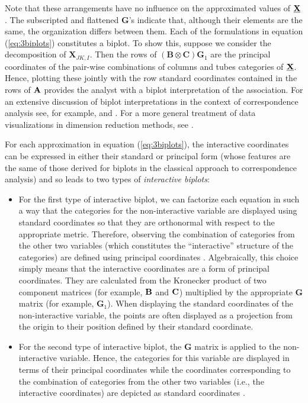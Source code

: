 Note that these arrangements have no influence on the approximated values of $\underline{\bf X}$. The subscripted and flattened $\mathbf{G}$'s indicate that, although their elements are the same, the organization differs between them. Each of the formulations in equation (\ref{eq:3biplots})  constitutes a biplot. To show this, suppose we consider the decomposition of $\mathbf{X}_{JK,I}$. Then the rows of $\left(\mathbf{B} \otimes \mathbf{C} \right) \mathbf{G}_1$ are the principal coordinates of the pair-wise combinations of columns and tubes categories of $\underline{\bf X}$. Hence, plotting these jointly with the row standard coordinates contained in the rows of ${\bf A}$ provides the analyst with a  biplot interpretation of the association. For an extensive discussion of biplot interpretations in the context of correspondence analysis see, for example, \citet{gre10} and \citet[Chapters 7 and 8]{gow11}. For a more general treatment of data visualizations in dimension reduction methods, see \cite{gow14}.

For each approximation in equation (\ref{eq:3biplots}), the interactive coordinates can be expressed in either their standard or principal form (whose features are the same of those derived for biplots in the classical approach to correspondence analysis) and so leads to two types of {\it interactive biplots}:
\begin{itemize}
	\item For the first type of interactive biplot, we can factorize each equation in such a way that the categories for the non-interactive variable are displayed using standard coordinates so that they are orthonormal with respect to the appropriate metric. Therefore, observing the combination of categories from the other two variables (which constitutes the ``interactive'' structure of the categories) are defined using principal coordinates \cite[][p. 273]{kro08}. Algebraically, this choice simply means that the interactive coordinates are a form of principal coordinates. They are calculated from the Kronecker product of two component matrices (for example, ${\bf B}$ and ${\bf C}$) multiplied by the appropriate $\mathbf{G}$ matrix (for example, $\mathbf{G}_1$). When displaying the standard coordinates of the non-interactive variable, the points are often displayed as a projection from the origin to their position defined by their standard coordinate.
	\item For the second type of interactive biplot, the $\mathbf{G}$ matrix is applied to the non-interactive variable. Hence, the categories for this variable are displayed in terms of their principal coordinates  while the coordinates corresponding to the combination of categories from the other two variables (i.e., the interactive coordinates) are depicted as standard coordinates \cite[]{lombehkro21}.
\end{itemize}

